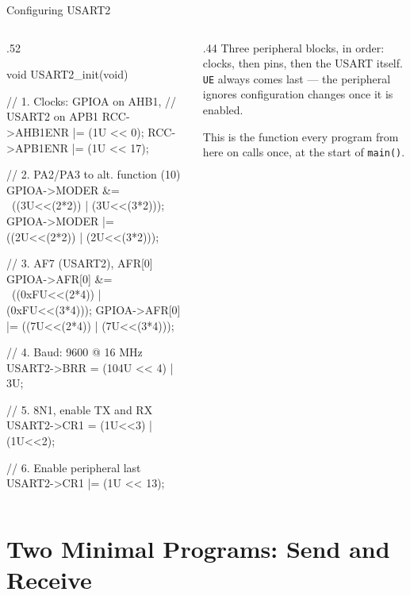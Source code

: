 \documentclass[9pt,aspectratio=169,xcolor=table]{beamer}
\begin{document}
\begin{frame}[fragile]{Configuring USART2}
    \begin{columns}[c]
    \begin{column}{.52\textwidth}
        \begin{cc}[basicstyle=\scriptsize\ttfamily]
void USART2_init(void) {
  // 1. Clocks: GPIOA on AHB1,
  //    USART2 on APB1
  RCC->AHB1ENR |= (1U << 0);
  RCC->APB1ENR |= (1U << 17);

  // 2. PA2/PA3 to alt. function (10)
  GPIOA->MODER &=  ~((3U<<(2*2)) | (3U<<(3*2)));
  GPIOA->MODER |=  ((2U<<(2*2)) | (2U<<(3*2)));

  // 3. AF7 (USART2), AFR[0]
  GPIOA->AFR[0] &= ~((0xFU<<(2*4)) | (0xFU<<(3*4)));
  GPIOA->AFR[0] |=  ((7U<<(2*4)) | (7U<<(3*4)));

  // 4. Baud: 9600 @ 16 MHz
  USART2->BRR = (104U << 4) | 3U;

  // 5. 8N1, enable TX and RX
  USART2->CR1 = (1U<<3) | (1U<<2);

  // 6. Enable peripheral last
  USART2->CR1 |= (1U << 13);
}
\end{cc}
    \end{column}
    \begin{column}{.44\textwidth}
        {\small Three peripheral blocks, in order: \alert{clocks}, then
        \alert{pins}, then the \alert{USART} itself. \texttt{UE} always comes
        last --- the peripheral ignores configuration changes once it is
        enabled.}

        \vspace{2mm}
        {\small This is the function every program from here on calls once,
        at the start of \texttt{main()}.}
    \end{column}
    \end{columns}
\end{frame}


\section{Two Minimal Programs: Send and Receive}
\end{document}
